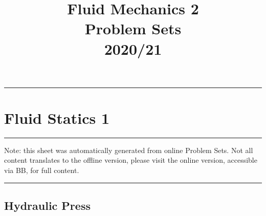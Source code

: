 \documentclass[11pt,a4paper]{article}%
\title{Fluid Mechanics 2\\Problem Sets \\2020/21}
\date{}
\newcommand{\ETrule}{
\begin{center}%
\rule[2.5pt]{\linewidth}{.5pt}%
\end{center}}%
\begin{document}
\ETrule\setcounter{section}{1}\section{Fluid Statics 1}\ETrule Note: this sheet was automatically generated from online Problem Sets. Not all content translates to the offline version, please visit the online version, accessible via BB, for full content.\ETrule\subsection{Hydraulic Press}
\end{document}
